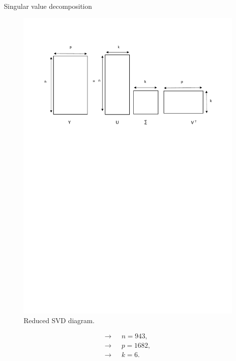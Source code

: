 \documentclass[unknownkeysallowed]{beamer}
\begin{document}
\begin{frame}{Singular value decomposition}
  \begin{figure}[H]
\centering
  \includegraphics[scale=0.4]{./images/svd.pdf}
  \caption{Reduced SVD diagram.}
  \label{fig:svd}
\end{figure} 
\begin{align*}
    \longrightarrow \text{ }& n=943,\\
    \longrightarrow \text{ }& p=1682,\\
    \longrightarrow \text{ }& k=6.
\end{align*}
\end{frame}
\end{document}
